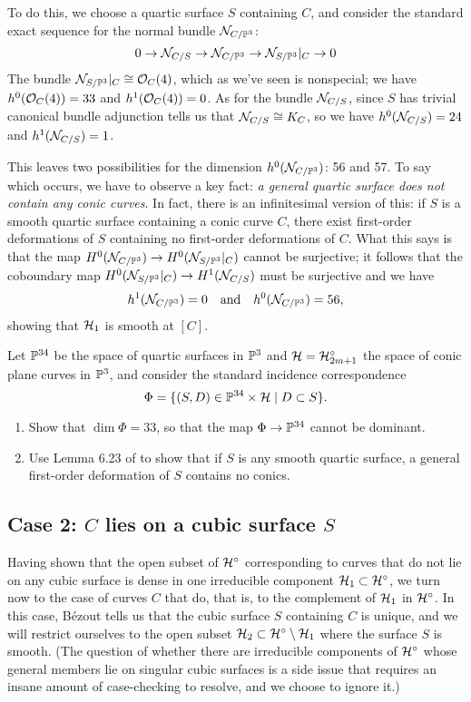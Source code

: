 To do this, we choose a quartic surface $S$ containing $C$, and consider the standard exact sequence for the normal bundle $\cN_{C/\PP^3}$:
$$
0 \to \cN_{C/S} \to \cN_{C/\PP^3} \to \cN_{S/\PP^3}|_C \to 0
$$
The bundle $\cN_{S/\PP^3}|_C \cong \cO_C(4)$, which as we've seen is nonspecial; we have $h^0(\cO_C(4)) = 33$ and $h^1(\cO_C(4)) = 0$. As for the bundle $\cN_{C/S}$,  since $S$ has trivial canonical bundle adjunction tells us that $\cN_{C/S} \cong K_C$, so we have $h^0(\cN_{C/S}) = 24$ and $h^1(\cN_{C/S}) = 1$.

This leaves two possibilities for the dimension $h^0(\cN_{C/\PP^3})$: 56 and 57. To say which occurs, we have to observe a key fact: \emph{a general quartic surface does not contain any conic curves}. In fact, there is an infinitesimal version of this: if $S$ is a smooth quartic surface containing a conic curve $C$, there exist first-order deformations of $S$ containing no first-order deformations of $C$. What this says is that the map
$H^0(\cN_{C/\PP^3}) \to H^0(\cN_{S/\PP^3}|_C)$ cannot be surjective; it follows that the coboundary map $H^0(\cN_{S/\PP^3}|_C) \to H^1(\cN_{C/S})$ must be surjective and we have
$$
h^1(\cN_{C/\PP^3}) = 0 \quad \text{and} \quad h^0(\cN_{C/\PP^3}) = 56,
$$
showing that $\cH_1$ is smooth at $[C]$.

\begin{exercise}
Let $\PP^{34}$ be the space of quartic surfaces in $\PP^3$ and $\cH = \cH^\circ_{2m+1}$ the space of conic plane curves in $\PP^3$, and consider the standard incidence correspondence
$$
\Phi = \{(S,D) \in \PP^{34} \times \cH \mid D \subset S \}.
$$
\begin{enumerate}
\item Show that $\dim \Phi = 33$, so that the map $\Phi \to \PP^{34}$ cannot be dominant.
\item Use Lemma 6.23 of \cite{3264} to show that if $S$ is any smooth quartic surface, a general first-order deformation of $S$ contains no conics.
\end{enumerate}
\end{exercise}


\subsection{Case 2: $C$ lies on a cubic surface $S$}

Having shown that the open subset of $\cH^\circ$ corresponding to curves that do not lie on any cubic surface is dense in one irreducible component  $\cH_1 \subset \cH^\circ$, we turn now to the case of curves $C$ that do, that is, to the complement of $\cH_1$ in $\cH^\circ$. In this case, B\'ezout tells us that the cubic surface $S$ containing $C$ is unique, and we will restrict ourselves to the open subset $\cH_2 \subset \cH^\circ \setminus \cH_1$ where the surface $S$ is smooth. (The question of whether there are irreducible components of $\cH^\circ$ whose general members lie on singular cubic surfaces is a side issue that requires an insane amount of case-checking to resolve, and we choose to ignore it.) 

